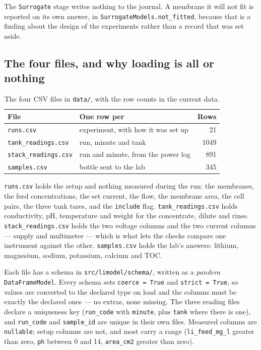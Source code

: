 The \texttt{Surrogate} stage writes nothing to the journal. A membrane it will not fit is
reported on its own answer, in \texttt{SurrogateModels.not\_fitted}, because that is a finding
about the design of the experiments rather than a record that was set aside.

\subsection{The four files, and why loading is all or nothing}

\begin{table}[htbp]
  \centering
  \caption{The four CSV files in \texttt{data/}, with the row counts in the current data.}
  \label{tab:files}
  \begin{tabular}{@{}llr@{}}
    \toprule
    File & One row per & Rows \\
    \midrule
    \texttt{runs.csv}           & experiment, with how it was set up        & 21 \\
    \texttt{tank\_readings.csv} & run, minute and tank                      & 1049 \\
    \texttt{stack\_readings.csv}& run and minute, from the power log        & 891 \\
    \texttt{samples.csv}        & bottle sent to the lab                    & 345 \\
    \bottomrule
  \end{tabular}
\end{table}

\texttt{runs.csv} holds the setup and nothing measured during the run: the membranes, the feed
concentrations, the set current, the flow, the membrane area, the cell pairs, the three tank
tares, and the \texttt{include} flag. \texttt{tank\_readings.csv} holds conductivity, pH,
temperature and weight for the concentrate, dilute and rinse.
\texttt{stack\_readings.csv} holds the two voltage columns and the two current columns ---
supply and multimeter --- which is what lets the checks compare one instrument against the
other. \texttt{samples.csv} holds the lab's answers: lithium, magnesium, sodium, potassium,
calcium and TOC.

Each file has a schema in \texttt{src/limodel/schema/}, written as a \emph{pandera}
\texttt{DataFrameModel}. Every schema sets \texttt{coerce = True} and \texttt{strict = True}, so
values are converted to the declared type on load and the columns must be exactly the declared
ones --- no extras, none missing. The three reading files declare a uniqueness key
(\texttt{run\_code} with \texttt{minute}, plus \texttt{tank} where there is one), and
\texttt{run\_code} and \texttt{sample\_id} are unique in their own files. Measured columns are
\texttt{nullable}; setup columns are not, and most carry a range (\texttt{li\_feed\_mg\_l}
greater than zero, \texttt{ph} between 0 and 14, \texttt{area\_cm2} greater than zero).

